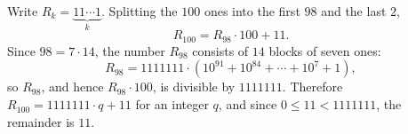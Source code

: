 Write $R_k=\underbrace{11\cdots1}_{k}$. Splitting the $100$ ones into the first $98$ and the last $2$,
\[
R_{100}=R_{98}\cdot100+11 .
\]
Since $98=7\cdot14$, the number $R_{98}$ consists of $14$ blocks of seven ones:
\[
R_{98}=1111111\cdot\left(10^{91}+10^{84}+\cdots+10^7+1\right),
\]
so $R_{98}$, and hence $R_{98}\cdot100$, is divisible by $1111111$. Therefore $R_{100}=1111111\cdot q+11$ for an integer $q$, and since $0\le11<1111111$, the remainder is $\boxed{11}$.
